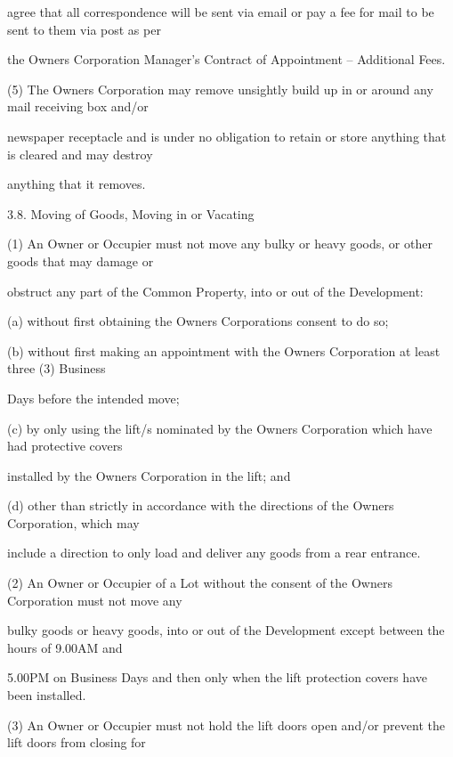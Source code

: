 \documentclass{article}
\begin{document}
{\fontsize{10.02}{1}agree that all correspondence will be sent via email or pay a fee for mail to be sent to them via post as per }

{\fontsize{10.02}{1}the Owners Corporation Manager’s Contract of Appointment – Additional Fees. }

{\fontsize{9.962}{1}(5) The Owners Corporation may remove unsightly build up in or around any mail receiving box and/or }

{\fontsize{10.02}{1}newspaper receptacle and is under no obligation to retain or store anything that is cleared and may destroy }

{\fontsize{10.02}{1}anything that it removes. }

{\fontsize{9.99}{1}3.8. Moving of Goods, Moving in or Vacating }

{\fontsize{9.962}{1}(1) An Owner or Occupier must not move any bulky or heavy goods, or other goods that may damage or }

{\fontsize{10.02}{1}obstruct any part of the Common Property, into or out of the Development: }

{\fontsize{9.962}{1}(a) without first obtaining the Owners Corporations consent to do so; }

{\fontsize{9.962}{1}(b) without first making an appointment with the Owners Corporation at least three (3) Business }

{\fontsize{10.02}{1}Days before the intended move; }

{\fontsize{9.962}{1}(c) by only using the lift/s nominated by the Owners Corporation which have had protective covers }

{\fontsize{10.02}{1}installed by the Owners Corporation in the lift; and }

{\fontsize{9.962}{1}(d) other than strictly in accordance with the directions of the Owners Corporation, which may }

{\fontsize{10.02}{1}include a direction to only load and deliver any goods from a rear entrance. }

{\fontsize{9.962}{1}(2) An Owner or Occupier of a Lot without the consent of the Owners Corporation must not move any }

{\fontsize{10.02}{1}bulky goods or heavy goods, into or out of the Development except between the hours of 9.00AM and }

{\fontsize{10.02}{1}5.00PM on Business Days and then only when the lift protection covers have been installed. }

{\fontsize{9.962}{1}(3) An Owner or Occupier must not hold the lift doors open and/or prevent the lift doors from closing for }
\end{document}
